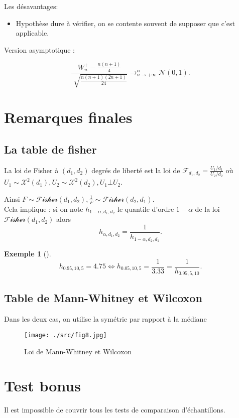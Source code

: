 \documentclass{article}
\theoremstyle{plain}%
\theoremstyle{definition}
\newtheorem{exmp}{Exemple}[section]
\theoremstyle{remark}
\begin{document}
Les désavantages:
\begin{itemize}
    \item Hypothèse dure à vérifier, on se contente souvent de supposer que c'est applicable.
\end{itemize}

Version asymptotique : 

\[
    \frac{W_n^+ - \frac{n(n+1)}{4}}{\sqrt[]{\frac{n(n+1)(2n+1)}{24}}} \to ^{\alpha }_{n \to +\infty }\mathcal{N}(0,1)
.\]

\section{Remarques finales}
\subsection{La table de fisher}
La loi de Fisher à $ (d_1, d_2) $ degrés de liberté est la loi de $ \mathcal{F}_{d_1, d_2} = \frac{U_1 / d_1}{U_2 / d_2} $ où $ U_1 \sim \mathcal{X}^2(d_1), U_2 \sim \mathcal{X}^2 (d_2), U_1 \bot U_2 $. 

Ainsi $ F \sim \mathcal{Fisher}(d_1, d_2), \frac{1}{F} \sim \mathcal{Fisher}(d_2, d_1) $.\\
Cela implique : si on note $ h_{1-\alpha , d_1, d_2} $ le quantile d'ordre $ 1 - \alpha  $ de la loi $ \mathcal{Fisher}(d_1, d_2) $ alors 
\[
    h_{\alpha, d_1, d_2} = \frac{1}{h_{1-\alpha, d_2, d_1}}
.\]
\begin{exmp}[]
    \[
        h_{0.95, 10, 5} = 4.75 \Leftrightarrow h_{0.05, 10, 5} = \frac{1}{3.33} = \frac{1}{h_{0.95, 5 ,10}}
    .\]
\end{exmp}

\subsection{Table de Mann-Whitney et Wilcoxon}
Dans les deux cas, on utilise la symétrie par rapport à la médiane 
\begin{figure}[!htbp]
    \centering
    \texttt{[image: ./src/fig8.jpg]}
    \caption{Loi de Mann-Whitney et Wilcoxon}
\end{figure}


\section{Test bonus}
Il est impossible de couvrir tous les tests de comparaison d'échantillons.
\end{document}
